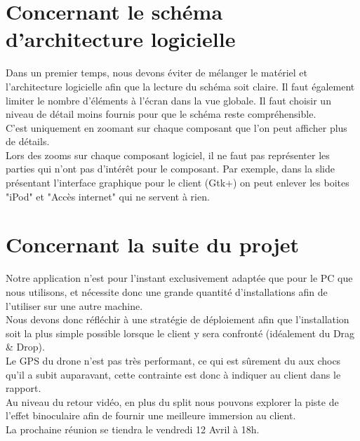 \documentclass[]{article}
\begin{document}
\section{Concernant le schéma d'architecture logicielle}
Dans un premier temps, nous devons éviter de mélanger le matériel et l'architecture logicielle afin que la lecture du schéma soit claire.
Il faut également limiter le nombre d'éléments à l'écran dans la vue globale. Il faut choisir un niveau de détail moins fournis pour que le schéma reste compréhensible. \\
C'est uniquement en zoomant sur chaque composant que l'on peut afficher plus de détails.\\
Lors des zooms sur chaque composant logiciel, il ne faut pas représenter les parties qui n'ont pas d'intérêt pour le composant. Par exemple, dans la slide présentant l'interface graphique pour le client (Gtk+) on peut enlever les boites "iPod" et "Accès internet" qui ne servent à rien.

\section{Concernant la suite du projet}

Notre application n'est pour l'instant exclusivement adaptée que pour le PC que nous utilisons, et nécessite donc une grande quantité d'installations afin de l'utiliser sur une autre machine.\\
Nous devons donc réfléchir à une stratégie de déploiement afin que l'installation soit la plus simple possible lorsque le client y sera confronté (idéalement du Drag \& Drop).\\
Le GPS du drone n'est pas très performant, ce qui est sûrement du aux chocs qu'il a subit auparavant, cette contrainte est donc à indiquer au client dans le rapport.\\
Au niveau du retour vidéo, en plus du split nous pouvons explorer la piste de l'effet binoculaire afin de fournir une meilleure immersion au client.\\
La prochaine réunion se tiendra le vendredi 12 Avril à 18h.
\end{document}
